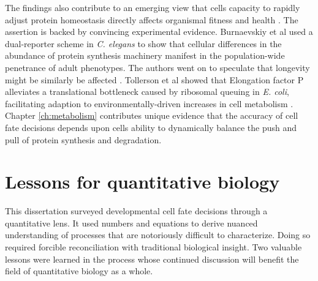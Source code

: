 The findings also contribute to an emerging view that cells capacity to rapidly adjust protein homeostasis directly affects organismal fitness and health \cite{Visscher2016,Tollerson2018,Burnaevskiy2018}. The assertion is backed by convincing experimental evidence. Burnaevskiy et al used a dual-reporter scheme in \textit{C. elegans} to show that cellular differences in the abundance of protein synthesis machinery manifest in the population-wide penetrance of adult phenotypes. The authors went on to speculate that longevity might be similarly be affected \cite{Burnaevskiy2018}. Tollerson et al showed that Elongation factor P alleviates a translational bottleneck caused by ribosomal queuing in \textit{E. coli}, facilitating adaption to environmentally-driven increases in cell metabolism \cite{Tollerson2018}. Chapter \ref{ch:metabolism} contributes unique evidence that the accuracy of cell fate decisions depends upon cells ability to dynamically balance the push and pull of protein synthesis and degradation. 

%
%
%
%
%

\section{Lessons for quantitative biology}

This dissertation surveyed developmental cell fate decisions through a quantitative lens. It used numbers and equations to derive nuanced understanding of processes that are notoriously difficult to characterize. Doing so required forcible reconciliation with traditional biological insight. Two valuable lessons were learned in the process whose continued discussion will benefit the field of quantitative biology as a whole.


